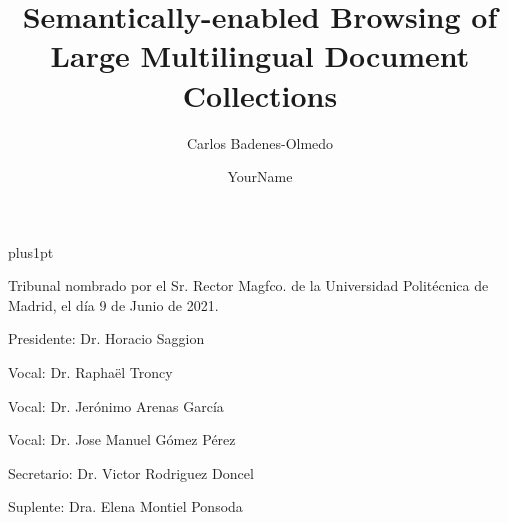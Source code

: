 \documentclass[twoside,11pt]{Latex/Classes/PhDthesisPSnPDF}
\title{Semantically-enabled Browsing of Large Multilingual Document Collections}
\author{{\hspace{16mm} Carlos Badenes-Olmedo }}
\author{YourName}
\begin{document}

\renewcommand\baselinestretch{1.2}
\baselineskip=18pt plus1pt

\theoremstyle{plain}
\newtheorem{thm}{Theorem}[chapter] %

\theoremstyle{definition}
\newtheorem{defn}[thm]{Definition} %

\newcommand{\attention}[1]{{\color{red}\textbf{#1}}}
\newcommand{\comm}[1]{{\color{red}(Comment:#1)}}
\newcommand{\duda}[1]{{\color{red}(DUDA:#1)}}

\renewcommand\appendixname{ANNEX}


\frontmatter
\maketitle  %



\pagestyle{plain}
\cleardoublepage
\pagestyle{plain}

\noindent Tribunal nombrado por el Sr. Rector Magfco. de la Universidad Polit\'{e}cnica de
Madrid, el d\'{i}a 9 de Junio de 2021.

\vspace{10mm}
Presidente:\hspace{0.3mm} Dr. Horacio Saggion

\vspace{5mm}
Vocal: \hspace{6.7mm} Dr. Raphaël Troncy

\vspace{5mm}
Vocal: \hspace{6.7mm} Dr. Jerónimo Arenas García

\vspace{5mm}
Vocal: \hspace{6.7mm} Dr. Jose Manuel Gómez Pérez

\vspace{5mm}
Secretario:\hspace{0.65mm} Dr. Victor Rodriguez Doncel

\vspace{5mm}
Suplente: \hspace{1.5mm} Dra. Elena Montiel Ponsoda
\end{document}
